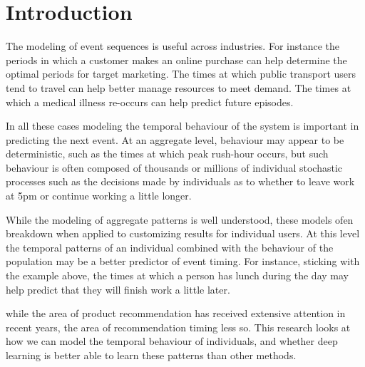 
\chapter{Introduction} %

\label{Chapter1} %


\newcommand{\keyword}[1]{\textbf{#1}}
\newcommand{\tabhead}[1]{\textbf{#1}}
\newcommand{\code}[1]{\texttt{#1}}
\newcommand{\file}[1]{\texttt{\bfseries#1}}
\newcommand{\option}[1]{\texttt{\itshape#1}}

The modeling of event sequences is useful across industries. For instance the periods in which a customer makes an online purchase can help determine the optimal periods for target marketing. The times at which public transport users tend to travel can help better manage resources to meet demand. The times at which a medical illness re-occurs can help predict future episodes.
 
In all these cases modeling the temporal behaviour of the system is important in predicting the next event. At an aggregate level, behaviour may appear to be deterministic, such as the times at which peak rush-hour occurs, but such behaviour is often composed of thousands or millions of individual stochastic processes such as the decisions made by individuals as to whether to leave work at 5pm or continue working a little longer.

While the modeling of aggregate patterns is well understood, these models ofen breakdown when applied to customizing results for individual users. At this level the temporal patterns of an individual combined with the behaviour of the population may be a better predictor of event timing. For instance, sticking with the example above, the times at which a person has lunch during the day may help predict that they will finish work a little later.

while the area of product recommendation has received extensive attention in recent years, the area of recommendation timing less so. This research looks at how we can model the temporal behaviour of individuals, and whether deep learning is better able to learn these patterns than other methods.

